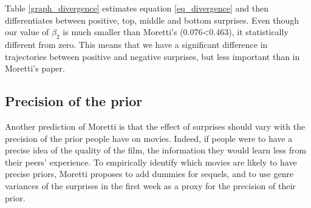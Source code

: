  Table \ref{graph_divergence} estimates equation \ref{eq_divergence} and then differentiates between positive, top, middle and bottom surprises. Even though our value of $\beta_2$ is much smaller than Moretti's (0.076<0.463), it statistically different from zero. This means that we have a significant difference in trajectories between positive and negative surprises, but less important than in Moretti's paper.
\subsection{Precision of the prior}\label{subsec2.3}
Another prediction of Moretti is that the effect of surprises should vary with the precision of the prior people have on movies. Indeed, if people were to have a precise idea of the quality of the film, the information they would learn less from their peers' experience. To empirically identify which movies are likely to have precise priors, Moretti proposes to add dummies for sequels, and to use genre variances of the surprises in the first week as a proxy for the precision of their prior. 


